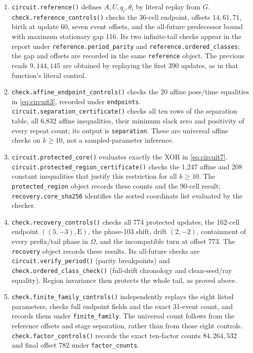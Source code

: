 \documentclass[
  11pt,
]{article}
\begin{document}
\begin{enumerate}
\item \nolinkurl{circuit.reference()} defines \(A,U,q_i,\theta_i\) by literal
replay from \(G\). \nolinkurl{check.reference_controls()} checks the
36-cell endpoint, offsets \(14,61,71\), birth at update 60, seven event
offsets, and the all-future predecessor bound with maximum stationary
gap 116. Its two infinite-tail checks appear in the report under
\nolinkurl{reference.period_parity} and \nolinkurl{reference.ordered_classes};
the gap and offsets are recorded in the same \nolinkurl{reference} object.
The previous reads \(9,144,145\) are obtained by replaying the first
390 updates, as in that function's literal control.
\item \nolinkurl{check.affine_endpoint_controls()} checks the 20 affine
pose/time equalities in \eqref{eq:circuit3}, recorded under
\nolinkurl{endpoints}. \nolinkurl{circuit.separation_certificate()} checks
all ten rows of the separation table, all 6,832 affine inequalities,
their minimum slack zero and positivity of every repeat count; its
output is \nolinkurl{separation}. These are universal affine checks on
\(k\ge10\), not a sampled-parameter inference.
\item \nolinkurl{circuit.protected_core()} evaluates exactly the XOR in
\eqref{eq:circuit7}. \nolinkurl{circuit.protected_region_certificate()}
checks the 1,247 affine and 208 constant inequalities that justify this
restriction for all \(k\ge10\). The \nolinkurl{protected_region} object
records these counts and the 90-cell result; \nolinkurl{recovery.core_sha256}
identifies the sorted coordinate list evaluated by the checker.
\item \nolinkurl{check.recovery_controls()} checks all 774 protected
updates, the 162-cell endpoint \(((5,-3),\mathrm E)\), the phase-103
shift, drift \((2,-2)\), containment of every prefix/tail phase in
\(\Omega\), and the incompatible turn at offset 773. The
\nolinkurl{recovery} object records these results. Its all-future checks
are \nolinkurl{circuit.verify_period()} (parity breakpoints) and
\nolinkurl{check.ordered_class_check()} (full-drift chronology and
clean-seed/ray equality). Region invariance then protects the whole
tail, as proved above.
\item \nolinkurl{check.finite_family_controls()} independently replays
the eight listed parameters, checks full endpoint fields and the exact
31-event count, and records them under \nolinkurl{finite_family}.
The universal count follows from the reference offsets and stage
separation, rather than from those eight controls.
\nolinkurl{check.factor_controls()} records the exact ten-factor counts
\(84,264,532\) and final offset 782 under \nolinkurl{factor_counts}.
\end{enumerate}
\end{document}
